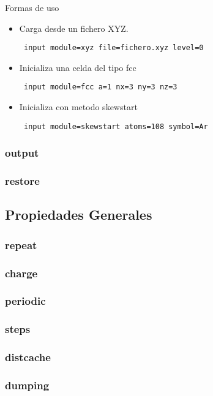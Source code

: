 \documentclass[a4paper,10pt]{scrbook}
\begin{document}
Formas de uso

\begin{itemize}
 \item Carga desde un fichero XYZ.
\begin{verbatim}
 input module=xyz file=fichero.xyz level=0
\end{verbatim}
 \item Inicializa una celda del tipo fcc
\begin{verbatim}
 input module=fcc a=1 nx=3 ny=3 nz=3
\end{verbatim}
 \item Inicializa con metodo skewstart
\begin{verbatim}
 input module=skewstart atoms=108 symbol=Ar
\end{verbatim}
\end{itemize}

\subsubsection{output}
\subsubsection{restore}

\subsection{Propiedades Generales}
\subsubsection{repeat}
\subsubsection{charge}
\subsubsection{periodic}
\subsubsection{steps}
\subsubsection{distcache}
\subsubsection{dumping}
\end{document}
